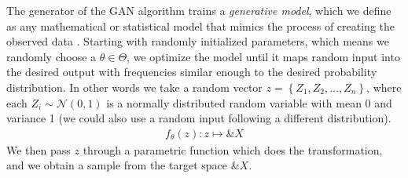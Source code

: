 %
%
%
%
%

The generator of the GAN algorithm trains a \textit{generative model},
which we define as any mathematical or statistical model that mimics
the process of creating the observed data \cite{ref:bishop}. Starting
with randomly initialized parameters, which means we randomly choose a
$\theta \in \Theta$, we optimize the model until it maps random input
into the desired output with frequencies similar enough to the desired
probability distribution. In other words we take a random vector $z
= \left\{Z_1, Z_2, \dots, Z_n\right\}$, where each $Z_i \sim
\mathcal{N}(0, 1)$ is a normally distributed random variable with mean
0 and variance 1 (we could also use a random input following a
different distribution).
\begin{align}
  \label{eq:gen-model} f_\theta(z): z \mapsto \&X
\end{align} We then pass $z$ through a parametric function which
does the transformation, and we obtain a sample from the target space
$\&X$.

